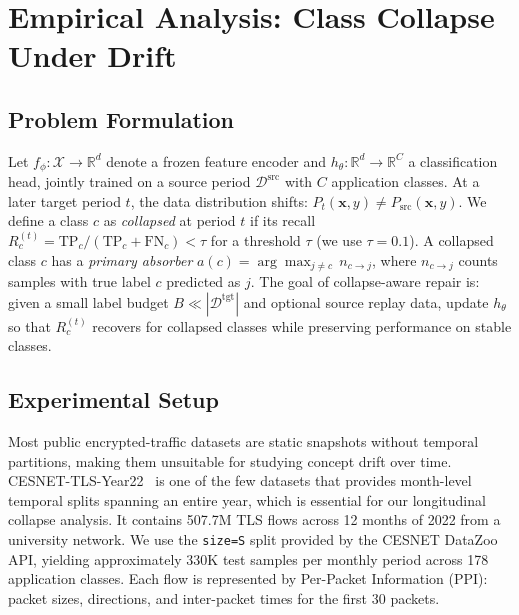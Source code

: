 \documentclass[journal]{IEEEtran}
\begin{document}
\section{Empirical Analysis: Class Collapse Under Drift}
\label{sec:analysis}

\subsection{Problem Formulation}
\label{sec:problem}

Let $f_\phi: \mathcal{X} \to \mathbb{R}^d$ denote a frozen feature encoder and $h_\theta: \mathbb{R}^d \to \mathbb{R}^C$ a classification head, jointly trained on a source period $\mathcal{D}^{\text{src}}$ with $C$ application classes.
At a later target period $t$, the data distribution shifts: $P_t(\mathbf{x}, y) \neq P_{\text{src}}(\mathbf{x}, y)$.
We define a class $c$ as \textit{collapsed} at period $t$ if its recall $R_c^{(t)} = \text{TP}_c / ({\text{TP}_c + \text{FN}_c}) < \tau$ for a threshold $\tau$ (we use $\tau{=}0.1$).
A collapsed class $c$ has a \textit{primary absorber} $a(c) = \arg\max_{j \neq c}\, n_{c \to j}$, where $n_{c \to j}$ counts samples with true label $c$ predicted as $j$.
The goal of collapse-aware repair is: given a small label budget $B \ll |\mathcal{D}^{\text{tgt}}|$ and optional source replay data, update $h_\theta$ so that $R_c^{(t)}$ recovers for collapsed classes while preserving performance on stable classes.

\subsection{Experimental Setup}
\label{sec:setup_analysis}

Most public encrypted-traffic datasets are static snapshots without temporal partitions, making them unsuitable for studying concept drift over time.
CESNET-TLS-Year22~\cite{hynek2024cesnet} is one of the few datasets that provides month-level temporal splits spanning an entire year, which is essential for our longitudinal collapse analysis.
It contains 507.7M TLS flows across 12 months of 2022 from a university network.
We use the \texttt{size=S} split provided by the CESNET DataZoo API, yielding approximately 330K test samples per monthly period across 178 application classes.
Each flow is represented by Per-Packet Information (PPI): packet sizes, directions, and inter-packet times for the first 30 packets.
\end{document}
